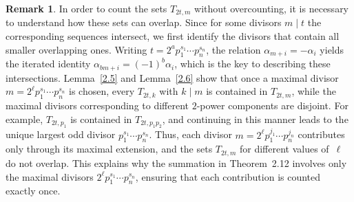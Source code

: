 \documentclass[a4paper,12pt]{amsart}
\numberwithin{equation}{section}
\theoremstyle{definition}
\newtheorem{remark}[theorem]{Remark}
\newcommand{\lemref}[1]{Lemma~\ref{#1}}
\numberwithin{equation}{section}
\begin{document}
\begin{remark}
In order to count the sets $T_{2t,m}$ without overcounting, it is necessary to
understand how these sets can overlap. Since for some divisors $m \mid t$ the corresponding sequences intersect, we first identify the divisors that
contain all smaller overlapping ones. Writing
$t = 2^{a} p_{1}^{s_{1}} \cdots p_{n}^{s_{n}}$, the relation
$\alpha_{m+i} = -\alpha_{i}$ yields the iterated identity
$\alpha_{bm+i} = (-1)^{b}\alpha_{i}$, which is the key to describing these
intersections. \lemref{2.5} and \lemref{2.6} show that once a maximal divisor $m = 2^{\ell} p_{1}^{s_{1}} \cdots p_{n}^{s_{n}}$ is chosen, every
$T_{2t,k}$ with $k \mid m$ is contained in $T_{2t,m}$, while the maximal divisors
corresponding to different $2$-power components are disjoint. For example,
$T_{2t,p_{1}}$ is contained in $T_{2t,p_{1}p_{2}}$, and continuing in this
manner leads to the unique largest odd divisor $p_{1}^{s_{1}} \cdots p_{n}^{s_{n}}$.
Thus, each divisor $m = 2^{\ell} p_{1}^{j_{1}} \cdots p_{n}^{j_{n}}$ contributes
only through its maximal extension, and the sets $T_{2t,m}$ for different
values of~$\ell$ do not overlap. This explains why the summation in
Theorem~2.12 involves only the maximal divisors
$2^{\ell}p_{1}^{s_{1}} \cdots p_{n}^{s_{n}}$, ensuring that each contribution is
counted exactly once.
\end{remark}
\end{document}
